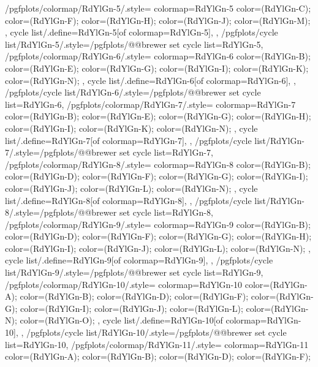 {  %
  /pgfplots/colormap/RdYlGn-5/.style={
    colormap={RdYlGn-5}{
      color=(RdYlGn-C);
      color=(RdYlGn-F);
      color=(RdYlGn-H);
      color=(RdYlGn-J);
      color=(RdYlGn-M);
    },
    cycle list/.define={RdYlGn-5}{[of colormap=RdYlGn-5]},
  },
  /pgfplots/cycle list/RdYlGn-5/.style={/pgfplots/@@brewer set cycle list={RdYlGn-5}},
  /pgfplots/colormap/RdYlGn-6/.style={
    colormap={RdYlGn-6}{
      color=(RdYlGn-B);
      color=(RdYlGn-E);
      color=(RdYlGn-G);
      color=(RdYlGn-I);
      color=(RdYlGn-K);
      color=(RdYlGn-N);
    },
    cycle list/.define={RdYlGn-6}{[of colormap=RdYlGn-6]},
  },
  /pgfplots/cycle list/RdYlGn-6/.style={/pgfplots/@@brewer set cycle list={RdYlGn-6}},
  /pgfplots/colormap/RdYlGn-7/.style={
    colormap={RdYlGn-7}{
      color=(RdYlGn-B);
      color=(RdYlGn-E);
      color=(RdYlGn-G);
      color=(RdYlGn-H);
      color=(RdYlGn-I);
      color=(RdYlGn-K);
      color=(RdYlGn-N);
    },
    cycle list/.define={RdYlGn-7}{[of colormap=RdYlGn-7]},
  },
  /pgfplots/cycle list/RdYlGn-7/.style={/pgfplots/@@brewer set cycle list={RdYlGn-7}},
  /pgfplots/colormap/RdYlGn-8/.style={
    colormap={RdYlGn-8}{
      color=(RdYlGn-B);
      color=(RdYlGn-D);
      color=(RdYlGn-F);
      color=(RdYlGn-G);
      color=(RdYlGn-I);
      color=(RdYlGn-J);
      color=(RdYlGn-L);
      color=(RdYlGn-N);
    },
    cycle list/.define={RdYlGn-8}{[of colormap=RdYlGn-8]},
  },
  /pgfplots/cycle list/RdYlGn-8/.style={/pgfplots/@@brewer set cycle list={RdYlGn-8}},
  /pgfplots/colormap/RdYlGn-9/.style={
    colormap={RdYlGn-9}{
      color=(RdYlGn-B);
      color=(RdYlGn-D);
      color=(RdYlGn-F);
      color=(RdYlGn-G);
      color=(RdYlGn-H);
      color=(RdYlGn-I);
      color=(RdYlGn-J);
      color=(RdYlGn-L);
      color=(RdYlGn-N);
    },
    cycle list/.define={RdYlGn-9}{[of colormap=RdYlGn-9]},
  },
  /pgfplots/cycle list/RdYlGn-9/.style={/pgfplots/@@brewer set cycle list={RdYlGn-9}},
  /pgfplots/colormap/RdYlGn-10/.style={
    colormap={RdYlGn-10}{
      color=(RdYlGn-A);
      color=(RdYlGn-B);
      color=(RdYlGn-D);
      color=(RdYlGn-F);
      color=(RdYlGn-G);
      color=(RdYlGn-I);
      color=(RdYlGn-J);
      color=(RdYlGn-L);
      color=(RdYlGn-N);
      color=(RdYlGn-O);
    },
    cycle list/.define={RdYlGn-10}{[of colormap=RdYlGn-10]},
  },
  /pgfplots/cycle list/RdYlGn-10/.style={/pgfplots/@@brewer set cycle list={RdYlGn-10}},
  /pgfplots/colormap/RdYlGn-11/.style={
    colormap={RdYlGn-11}{
      color=(RdYlGn-A);
      color=(RdYlGn-B);
      color=(RdYlGn-D);
      color=(RdYlGn-F);
}}}

